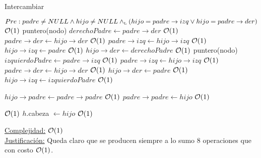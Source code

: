 \begin{Algoritmos}
\begin{algorithm}
\caption{Intercambiar}
\begin{algorithmic}[1]
	\State \Comment $Pre: padre \neq NULL \land hijo \neq NULL \land_{\mathrm{\scriptscriptstyle{L}}} (hijo = padre \to izq \lor hijo = padre \to der)$  
   \Comment $\mathcal{O}(1)$
    \State puntero(nodo) $derechoPadre \gets padre \to der$ \Comment $\mathcal{O}(1)$
    \State $padre \to der \gets hijo \to der$ \Comment $\mathcal{O}(1)$
    \State $padre \to izq \gets hijo \to izq$ \Comment $\mathcal{O}(1)$
    \State $hijo \to izq \gets padre$ \Comment $\mathcal{O}(1)$
    \State $hijo \to der \gets derechoPadre$ \Comment $\mathcal{O}(1)$
  \Else
    \State puntero(nodo) $izquierdoPadre \gets padre \to izq$ \Comment $\mathcal{O}(1)$
    \State $padre \to izq \gets hijo \to izq$ \Comment $\mathcal{O}(1)$
    \State $padre \to der \gets hijo \to der$ \Comment $\mathcal{O}(1)$
    \State $hijo \to der \gets padre$ \Comment $\mathcal{O}(1)$
    \State $hijo \to izq \gets izquierdoPadre$ \Comment $\mathcal{O}(1)$
  \EndIf

  \State $hijo \to padre \gets padre \to padre$ \Comment $\mathcal{O}(1)$
  \State $padre \to padre \gets hijo$ \Comment $\mathcal{O}(1)$
  
   \Comment $\mathcal{O}(1)$
    \State$h$.cabeza $\gets hijo$ \Comment $\mathcal{O}(1)$
  \EndIf 
 \EndProcedure
\end{algorithmic}
 \underline{Complejidad:} $\mathcal{O}(1)$\\
 \underline{Justificación:} Queda claro que se producen siempre a lo sumo 8 operaciones que con costo $\mathcal{O}(1)$.
\end{algorithm}

\end{Algoritmos}











